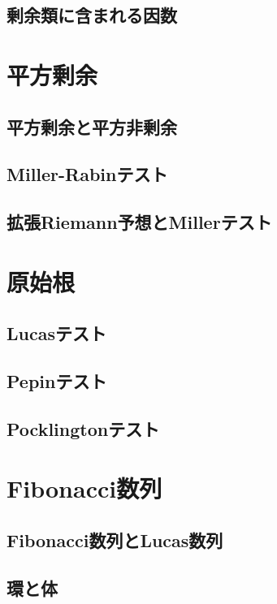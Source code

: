 \subsection{剰余類に含まれる因数}


\section{平方剰余}
\subsection{平方剰余と平方非剰余}

\subsection{Miller-Rabinテスト}

\subsection{拡張Riemann予想とMillerテスト}


\section{原始根}
\subsection{Lucasテスト}

\subsection{Pepinテスト}

\subsection{Pocklingtonテスト}


\section{Fibonacci数列}
\subsection{Fibonacci数列とLucas数列}

\subsection{環と体}

